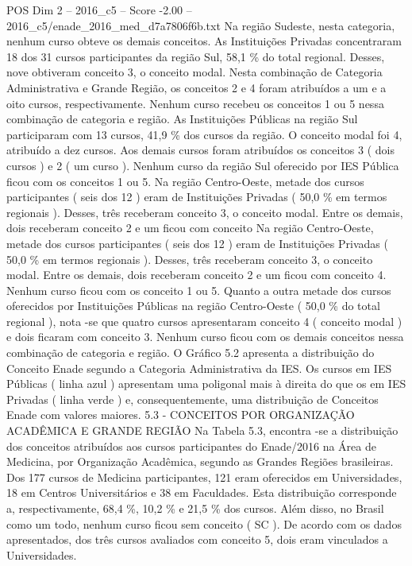 \begin{textsample}{POS Dim 2 – 2016\_c5 – Score -2.00 – 2016\_c5/enade\_2016\_med\_d7a7806f6b.txt}
Na região Sudeste, nesta categoria, nenhum curso obteve os demais conceitos.
As Instituições Privadas concentraram 18 dos 31 cursos participantes da região Sul, 58,1 \% do total regional.
Desses, nove obtiveram conceito 3, o conceito modal.
Nesta combinação de Categoria Administrativa e Grande Região, os conceitos 2 e 4 foram atribuídos a um e a oito cursos, respectivamente.
Nenhum curso recebeu os conceitos 1 ou 5 nessa combinação de categoria e região.
As Instituições Públicas na região Sul participaram com 13 cursos, 41,9 \% dos cursos da região.
O conceito modal foi 4, atribuído a dez cursos.
Aos demais cursos foram atribuídos os conceitos 3 ( dois cursos ) e 2 ( um curso ).
Nenhum curso da região Sul oferecido por IES Pública ficou com os conceitos 1 ou 5.
Na região Centro-Oeste, metade dos cursos participantes ( seis dos 12 ) eram de Instituições Privadas ( 50,0 \% em termos regionais ).
Desses, três receberam conceito 3, o conceito modal.
Entre os demais, dois receberam conceito 2 e um ficou com conceito Na região Centro-Oeste, metade dos cursos participantes ( seis dos 12 ) eram de Instituições Privadas ( 50,0 \% em termos regionais ).
Desses, três receberam conceito 3, o conceito modal.
Entre os demais, dois receberam conceito 2 e um ficou com conceito 4.
Nenhum curso ficou com os conceito 1 ou 5.
Quanto a outra metade dos cursos oferecidos por Instituições Públicas na região Centro-Oeste ( 50,0 \% do total regional ), nota -se que quatro cursos apresentaram conceito 4 ( conceito modal ) e dois ficaram com conceito 3.
Nenhum curso ficou com os demais conceitos nessa combinação de categoria e região.
O Gráfico 5.2 apresenta a distribuição do Conceito Enade segundo a Categoria Administrativa da IES.
Os cursos em IES Públicas ( linha azul ) apresentam uma poligonal mais à direita do que os em IES Privadas ( linha verde ) e, consequentemente, uma distribuição de Conceitos Enade com valores maiores. 5.3 - CONCEITOS POR ORGANIZAÇÃO ACADÊMICA E GRANDE REGIÃO Na Tabela 5.3, encontra -se a distribuição dos conceitos atribuídos aos cursos participantes do Enade/2016 na Área de Medicina, por Organização Acadêmica, segundo as Grandes Regiões brasileiras.
Dos 177 cursos de Medicina participantes, 121 eram oferecidos em Universidades, 18 em Centros Universitários e 38 em Faculdades.
Esta distribuição corresponde a, respectivamente, 68,4 \%, 10,2 \% e 21,5 \% dos cursos.
Além disso, no Brasil como um todo, nenhum curso ficou sem conceito ( SC ).
De acordo com os dados apresentados, dos três cursos avaliados com conceito 5, dois eram vinculados a Universidades.

\end{textsample}
